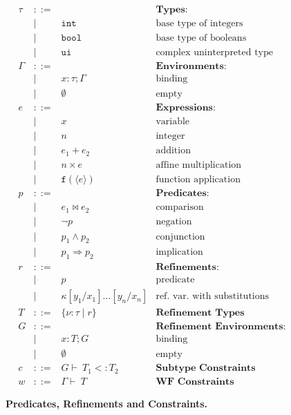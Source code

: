 \documentclass[nocopyrightspace]{sigplanconf}
\newcommand{\figbegin}{}
\newcommand{\figend}{}
\def\set#1{{\{ #1\}}}
\newcommand{\ttf}{\mathtt{f}}
\def\zug#1{{\langle #1 \rangle}}
\def\subt{<:}
\def\valu{\nu}
\newcommand{\ftyp}[2]{{{#1}\!:\!{#2}}}
\newcommand{\SUBST}[3]{{#1}[{#3}/{#2}]}
\newcommand{\EXT}[2]{{#1;\!#2}}
\newcommand{\mybar}[1]{\zug{#1}}
\newcommand{\kvar}{\kappa}
\newcommand{\tenv}{\Gamma}
\newcommand{\renv}{G}
\def\ttunint{\mathtt{ui}}
\def\ttint{\mathtt{int}}
\def\ttbool{\mathtt{bool}}
\newcommand{\typ}{\tau}
\newcommand{\tliqs}{T}
\newcommand{\reftyp}[3]{\set{\ftyp{{#1}}{{#2}} \mid {#3}}}
\newcommand{\deriv}{\vdash\ }
\newcommand{\rela}{\bowtie}
\begin{document}
\begin{figure}[t]
\figbegin
\begin{displaymath}
\begin{array}{lrll}
\typ & ::= &				& \textbf{Types:} \\
  & \mid & \ttint			& \mbox{base type of integers} \\
  & \mid & \ttbool			& \mbox{base type of booleans} \\
  & \mid & \ttunint			& \mbox{complex uninterpreted type} \\[4pt]

\tenv & ::= & 				& \textbf{Environments:} \\
  & \mid & \EXT{\ftyp{x}{\typ}}{\tenv}  & \mbox{binding} \\
  & \mid & \emptyset 			& \mbox{empty} \\[4pt]

e & ::=  &         			& \textbf{Expressions:} \\
  & \mid & x 				& \mbox{variable} \\
  & \mid & n				& \mbox{integer} \\
  & \mid & e_1 + e_2 			& \mbox{addition} \\
  & \mid & n \times e	 		& \mbox{affine multiplication} \\
  & \mid & \ttf(\mybar{e}) 		& \mbox{function application} \\[4pt]

p & ::=  &         			& \textbf{Predicates:} \\
  & \mid & e_1 \rela e_2  		& \mbox{comparison} \\
  & \mid & \neg p 			& \mbox{negation} \\
  & \mid & p_1 \wedge p_2		& \mbox{conjunction} \\
  & \mid & p_1 \Rightarrow p_2		& \mbox{implication} \\[4pt]

r & ::= &				& \textbf{Refinements:} \\
  & \mid & p				& \mbox{predicate} \\
  & \mid & 
  \SUBST{\kvar}{x_1}{y_1}\ldots\SUBST{}{x_n}{y_n} 
& \mbox{ref.\ var.\ with substitutions} \\[4pt]
\tliqs & ::= &	\reftyp{\valu}{\typ}{r}	& \textbf{Refinement Types} \\[4pt]
\renv & ::= & 				& \textbf{Refinement Environments:} \\
  & \mid & \EXT{\ftyp{x}{\tliqs}}{\renv}& \mbox{binding} \\
  & \mid & \emptyset 			& \mbox{empty} \\[4pt]
c & ::= & \renv \deriv \tliqs_1 \subt \tliqs_2 	
					& \textbf{Subtype Constraints} \\[4pt]
w & ::= & \tenv \deriv \tliqs	 	& \textbf{WF Constraints}
\end{array} 
\end{displaymath}
\figend
\caption{\textbf{Predicates, Refinements and Constraints.}}
\label{fig:logic}
\label{fig:constraints}
\end{figure}
\end{document}
